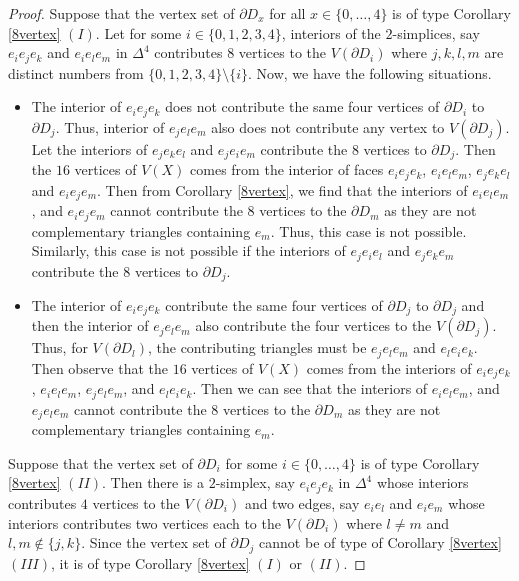 \documentclass[11pt]{amsart}
\numberwithin{equation}{section}
\theoremstyle{definition}
\newcommand{\D}{\Delta}
\begin{document}
\begin{proof}
Suppose that the vertex set of $\partial D_x$ for all $x\in\{0,\ldots,4\}$ is of type Corollary \ref{8vertex} $(I)$. Let for some $i\in\{0,1,2,3,4\}$, interiors of the  $2$-simplices, say $e_ie_je_k$ and $e_ie_le_m$ in $\D^4$   contributes $8$ vertices to the $V(\partial D_i)$ where $j,k,l,m$ are distinct numbers from $\{0,1,2,3,4\}\setminus \{i\}$. Now, we have the following situations.

\begin{itemize}
    \item The interior of $e_ie_je_k$  does not contribute the same four vertices of $\partial D_i$ to $\partial D_j$. Thus, interior of $e_je_le_m$   also does not contribute any vertex to $V(\partial D_j)$. Let the interiors of $e_je_ke_l$ and $e_je_ie_m$ contribute the $8$ vertices to $\partial D_j$. Then the $16$ vertices of $V(X)$ comes from the interior of faces $e_ie_je_k$, $e_ie_le_m$, $e_je_ke_l$ and $e_ie_je_m$. Then from Corollary \ref{8vertex}, we find that the interiors of $e_ie_le_m$,  and $e_ie_je_m$ cannot contribute the $8$ vertices to the $\partial D_m$ as they are not complementary triangles containing $e_m$. Thus, this case is not possible. Similarly, this case is not possible if the interiors of $e_je_ie_l$ and $e_je_ke_m$ contribute the $8$ vertices to $\partial D_j$.
    
   \item The interior of $e_ie_je_k$ contribute the same four vertices of $\partial D_j$ to $\partial D_j$ and then the interior of $e_je_le_m$ also contribute the four vertices to the $V(\partial D_j)$. Thus, for $V(\partial D_l)$, the contributing triangles must be $e_je_le_m$ and $e_le_ie_k$. Then observe that the $16$ vertices of $V(X)$ comes from the interiors of $e_ie_je_k$, $e_ie_le_m$, $e_je_le_m$, and $e_le_ie_k$. Then we can see that the interiors of $e_ie_le_m$,  and $e_je_le_m$ cannot contribute the $8$ vertices to the $\partial D_m$ as they are not complementary triangles containing $e_m$.    
\end{itemize}

Suppose that the vertex set of $\partial D_i$ for some $i\in\{0,\ldots,4\}$ is of type Corollary \ref{8vertex} $(II)$. Then there is a $2$-simplex, say $e_ie_je_k$ in $\D^4$  whose interiors contributes $4$ vertices to the $V(\partial D_i)$ and two edges, say $e_ie_l$ and $e_ie_m$ whose interiors contributes two vertices each to the  $V(\partial D_i)$ where $l\neq m$ and $l,m\notin\{j,k\}$. Since the vertex set of $\partial D_j$ cannot be of type of Corollary \ref{8vertex} $(III)$, it is of type Corollary \ref{8vertex} $(I)$ or $(II)$. 


\end{proof}
\end{document}
